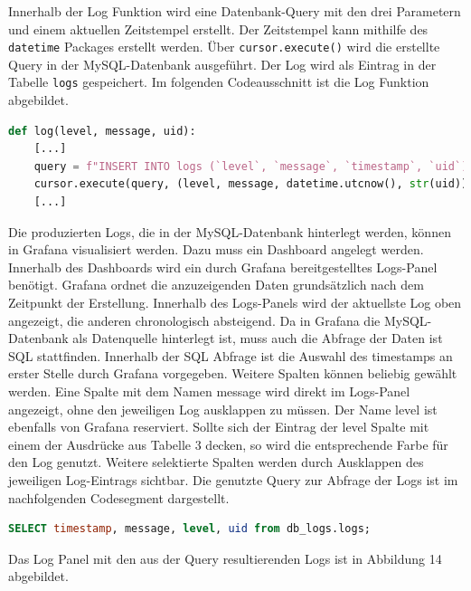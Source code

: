 Innerhalb der Log Funktion wird eine Datenbank-Query mit den drei Parametern und einem aktuellen Zeitstempel erstellt. Der Zeitstempel kann mithilfe des \texttt{datetime} Packages erstellt werden. Über \texttt{cursor.execute()} wird die erstellte Query in der MySQL-Datenbank ausgeführt. Der Log wird als Eintrag in der Tabelle \texttt{logs} gespeichert. Im folgenden Codeausschnitt ist die Log Funktion abgebildet.

\begin{lstlisting}[language=Python, caption={Erstellung eines Logs}]
def log(level, message, uid):
    [...]
    query = f"INSERT INTO logs (`level`, `message`, `timestamp`, `uid`) VALUES (%s, %s, %s, %s)"
    cursor.execute(query, (level, message, datetime.utcnow(), str(uid)))
    [...]
\end{lstlisting}

Die produzierten Logs, die in der MySQL-Datenbank hinterlegt werden, können in Grafana visualisiert werden. Dazu muss ein Dashboard angelegt werden. Innerhalb des Dashboards wird ein durch Grafana bereitgestelltes Logs-Panel benötigt. Grafana ordnet die anzuzeigenden Daten grundsätzlich nach dem Zeitpunkt der Erstellung. Innerhalb des Logs-Panels wird der aktuellste Log oben angezeigt, die anderen chronologisch absteigend. Da in Grafana die MySQL-Datenbank als Datenquelle hinterlegt ist, muss auch die Abfrage der Daten ist SQL stattfinden. Innerhalb der SQL Abfrage ist die Auswahl des timestamps an erster Stelle durch Grafana vorgegeben. Weitere Spalten können beliebig gewählt werden. Eine Spalte mit dem Namen \glqq message\grqq{} wird direkt im Logs-Panel angezeigt, ohne den jeweiligen Log ausklappen zu müssen. Der Name \glqq level\grqq{} ist ebenfalls von Grafana reserviert. Sollte sich der Eintrag der \glqq level\grqq{} Spalte mit einem der Ausdrücke aus Tabelle 3 decken, so wird die entsprechende Farbe für den Log genutzt. Weitere selektierte Spalten werden durch Ausklappen des jeweiligen Log-Eintrags sichtbar. Die genutzte Query zur Abfrage der Logs ist im nachfolgenden Codesegment dargestellt.

\begin{lstlisting}[language=SQL, caption={Query zur Abfrage der Logs in Grafana}]
SELECT timestamp, message, level, uid from db_logs.logs;
\end{lstlisting}

Das Log Panel mit den aus der Query resultierenden Logs ist in Abbildung 14 abgebildet.


